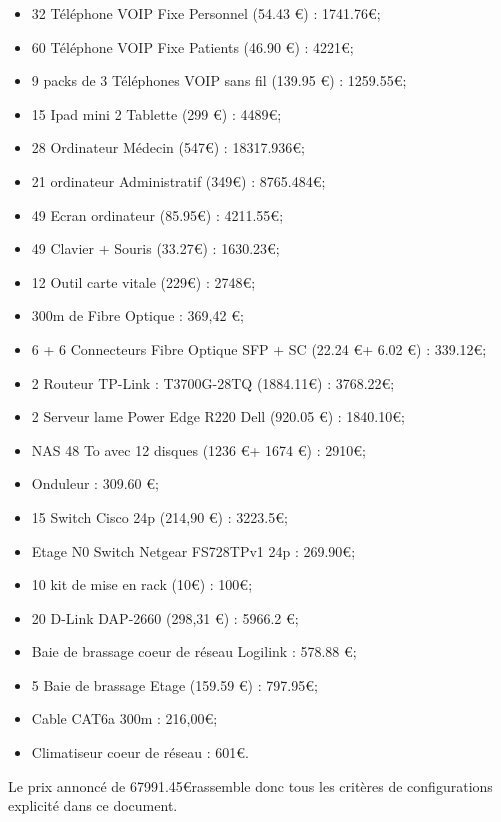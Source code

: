 \begin{itemize}
\item 32 Téléphone VOIP Fixe Personnel (54.43 \euro) : 1741.76\euro ;
\item 60 Téléphone VOIP Fixe Patients (46.90 \euro) : 4221\euro ;
\item   9 packs de 3 Téléphones VOIP sans fil (139.95 \euro )   : 1259.55\euro;
\item  15 Ipad mini 2 Tablette (299 \euro)   : 4489\euro;
\item  28 Ordinateur Médecin (547\euro )   : 18317.936\euro;
\item   21 ordinateur Administratif (349\euro)   : 8765.484\euro;
\item   49 Ecran ordinateur (85.95\euro)   : 4211.55\euro ;
\item   49 Clavier + Souris (33.27\euro)   : 1630.23\euro;
\item  12 Outil carte vitale (229\euro)   : 2748\euro;
\item   300m de Fibre Optique : 369,42 \euro ;
\item  6 + 6 Connecteurs Fibre Optique SFP + SC (22.24 \euro + 6.02 \euro)   : 339.12\euro;
\item     2  Routeur TP-Link : T3700G-28TQ      (1884.11\euro)            :    3768.22\euro    ;
\item       2  Serveur lame Power Edge R220 Dell    (920.05 \euro)            :   1840.10\euro     ;
\item      NAS 48 To avec 12 disques   (1236 \euro + 1674 \euro)            :    2910\euro     ;
\item        Onduleur               :       309.60 \euro  ;
\item          15 Switch Cisco 24p        (214,90 \euro)   :    3223.5\euro     ;
\item              Etage N0 Switch Netgear FS728TPv1 24p       :    269.90\euro     ;
\item        10   kit de mise en rack  (10\euro)            :     100\euro    ;
\item         20  D-Link DAP-2660 (298,31 \euro)            :     5966.2 \euro    ;
\item          Baie de brassage coeur de réseau Logilink          :      578.88 \euro   ;
\item          5 Baie de brassage Etage  (159.59 \euro)            :     797.95\euro    ;
\item            Cable CAT6a 300m          :      216,00\euro   ;
\item            Climatiseur coeur de réseau          :     601\euro    .
\end{itemize}

Le prix annoncé de 67991.45\euro  rassemble donc tous les critères de configurations explicité dans ce document.



%
